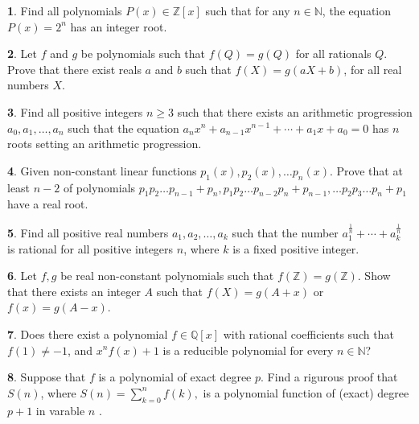 \documentclass{article}
\theoremstyle{definition}
\newtheorem{p}{}
\begin{document}
\begin{p}
Find all polynomials $P(x)\in \mathbb Z[x]$ such that for any $n\in \mathbb N$, the equation $P(x)=2^{n}$ has an integer root.
\end{p}



\begin{p}
Let $f$ and $g$ be polynomials such that $f(Q)=g(Q)$ for all rationals $Q$. Prove that there exist reals $a$ and $b$ such that $f(X)=g(aX+b)$, for all real numbers $X$.
\end{p}



\begin{p}
Find all positive integers $ n\geq 3 $ such that there exists an arithmetic progression $ a_0 , a_1, \ldots, a_n $ such that the equation $ a_nx^n + a_{n-1}x^{n-1} + \cdots+ a_1x+a_0 = 0 $ has $n$ roots setting an arithmetic progression.
\end{p}



\begin{p}
Given non-constant linear functions $p_1(x), p_2(x), \dots p_n(x)$. Prove that at least $n-2$ of polynomials $p_1p_2\dots p_{n-1}+p_n,  p_1p_2\dots p_{n-2} p_n + p_{n-1},\dots p_2p_3\dots p_n+p_1$ have a real root.
\end{p}



\begin{p}
Find all positive real numbers $a_1,a_2,\ldots,a_k$ such that the number $ a_1^{\frac{1}{n}}+\cdots+a_k^{\frac{1}{n}}$ is rational for all positive integers $n$, where $k$ is a fixed positive integer.
\end{p}



\begin{p}
Let $f,g$ be real non-constant polynomials such that $ f(\mathbb Z)=g(\mathbb Z) $. Show that there exists an integer $A$ such that $ f(X)=g(A+x) $ or $ f(x)=g(A-x) $. 
\end{p}


\begin{p}
Does there exist a polynomial $f \in \mathbb{Q}[x]$ with rational coefficients such that $f(1) \neq -1$, and $x^nf(x) + 1$ is a reducible polynomial for every $n \in \mathbb{N}$?
\end{p}



\begin{p}
Suppose that  $ f $ is a polynomial of exact degree  $ p.$ Find a rigurous proof that $ S(n) $,  where  $ S(n)= \sum\limits_{k=0}^{n}f(k) , $  is a polynomial function  of (exact) degree  $ p+1 $ in varable $n $ .
\end{p}
\end{document}
